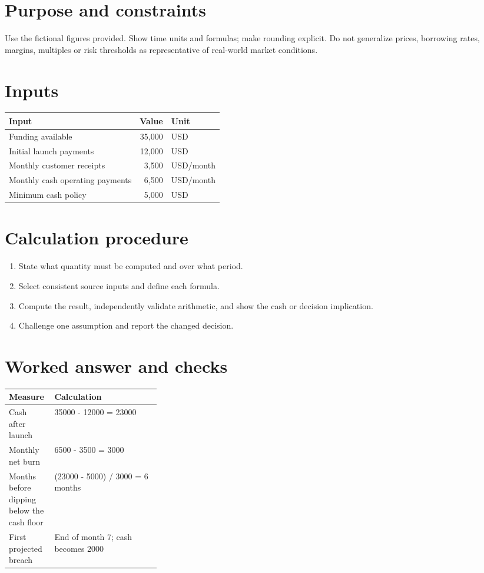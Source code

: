 \documentclass[11pt]{article}
\begin{document}
\SuiteOpen
\section{Purpose and constraints}
Use the fictional figures provided. Show time units and formulas; make rounding explicit. Do not generalize prices, borrowing rates, margins, multiples or risk thresholds as representative of real-world market conditions.
\section{Inputs}
\begin{tabularx}{\linewidth}{@{}Y r l@{}}\toprule Input & Value & Unit\\\midrule
Funding available & 35,000 & USD\\
Initial launch payments & 12,000 & USD\\
Monthly customer receipts & 3,500 & USD/month\\
Monthly cash operating payments & 6,500 & USD/month\\
Minimum cash policy & 5,000 & USD\\
\bottomrule\end{tabularx}
\section{Calculation procedure}
\begin{enumerate}[leftmargin=*,itemsep=5pt]
\item State what quantity must be computed and over what period.
\item Select consistent source inputs and define each formula.
\item Compute the result, independently validate arithmetic, and show the cash or decision implication.
\item Challenge one assumption and report the changed decision.
\end{enumerate}

\section{Worked answer and checks}
\begin{tabularx}{\linewidth}{@{}p{0.30\linewidth}Y@{}}\toprule Measure & Calculation\\\midrule
Cash after launch & 35000 - 12000 = 23000\\
Monthly net burn & 6500 - 3500 = 3000\\
Months before dipping below the cash floor & (23000 - 5000) / 3000 = 6 months\\
First projected breach & End of month 7; cash becomes 2000\\
\bottomrule\end{tabularx}
\end{document}

